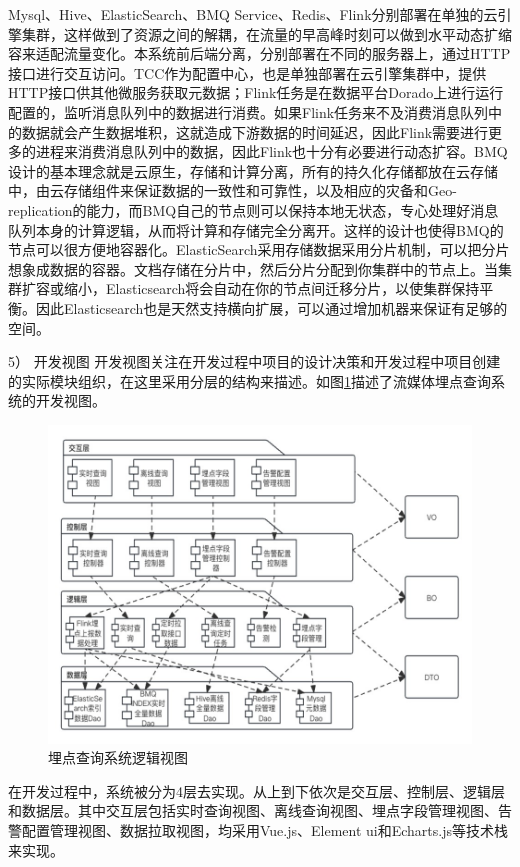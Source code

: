 Mysql、Hive、ElasticSearch、BMQ Service、Redis、Flink分别部署在单独的云引擎集群，这样做到了资源之间的解耦，在流量的早高峰时刻可以做到水平动态扩缩容来适配流量变化。本系统前后端分离，分别部署在不同的服务器上，通过HTTP接口进行交互访问。TCC作为配置中心，也是单独部署在云引擎集群中，提供HTTP接口供其他微服务获取元数据；Flink任务是在数据平台Dorado上进行运行配置的，监听消息队列中的数据进行消费。如果Flink任务来不及消费消息队列中的数据就会产生数据堆积，这就造成下游数据的时间延迟，因此Flink需要进行更多的进程来消费消息队列中的数据，因此Flink也十分有必要进行动态扩容。BMQ设计的基本理念就是云原生，存储和计算分离，所有的持久化存储都放在云存储中，由云存储组件来保证数据的一致性和可靠性，以及相应的灾备和Geo-replication的能力，而BMQ自己的节点则可以保持本地无状态，专心处理好消息队列本身的计算逻辑，从而将计算和存储完全分离开。这样的设计也使得BMQ的节点可以很方便地容器化。ElasticSearch采用存储数据采用分片机制，可以把分片想象成数据的容器。文档存储在分片中，然后分片分配到你集群中的节点上。当集群扩容或缩小，Elasticsearch将会自动在你的节点间迁移分片，以使集群保持平衡。因此Elasticsearch也是天然支持横向扩展，可以通过增加机器来保证有足够的空间。

5）	开发视图
开发视图关注在开发过程中项目的设计决策和开发过程中项目创建的实际模块组织，在这里采用分层的结构来描述。如图\ref{xitongkaifa}描述了流媒体埋点查询系统的开发视图。
 \begin{figure}[htb]
  \centering
  \includegraphics[width=5in]{figure/chapter4/系统开发视图.jpg}
  \caption{埋点查询系统逻辑视图}\label{xitongkaifa}
\end{figure}
在开发过程中，系统被分为4层去实现。从上到下依次是交互层、控制层、逻辑层和数据层。其中交互层包括实时查询视图、离线查询视图、埋点字段管理视图、告警配置管理视图、数据拉取视图，均采用Vue.js、Element ui和Echarts.js等技术栈来实现。

